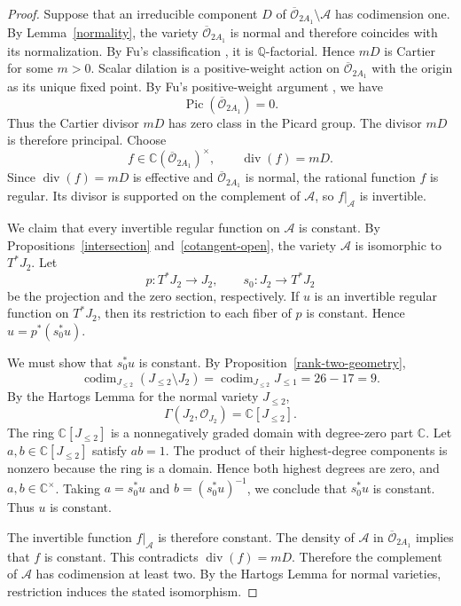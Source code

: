 \documentclass[12pt]{article}
\theoremstyle{definition}
\DeclareMathOperator{\codim}{codim}
\begin{document}
\begin{proof}
Suppose that an irreducible component \(D\) of
\(\overline{\mathcal O}_{2A_1}\setminus\mathcal A\) has codimension one.
By Lemma~\ref{normality}, the variety \(\overline{\mathcal O}_{2A_1}\) is
normal and therefore coincides with its normalization. By Fu's
classification \cite[Proposition~4.4]{FuQFactorial}, it is
\(\mathbb Q\)-factorial. Hence \(mD\) is Cartier for some
\(m>0\). Scalar dilation is a positive-weight action on
\(\overline{\mathcal O}_{2A_1}\) with the origin as its unique fixed point. By
Fu's positive-weight argument
\cite[Proof of Lemma~4.3]{FuQFactorial}, we have
\[
    \operatorname{Pic}(\overline{\mathcal O}_{2A_1})=0.
\]
Thus the Cartier divisor \(mD\) has zero class in the Picard group. The
divisor \(mD\) is therefore principal. Choose
\[
    f\in\mathbb C(\overline{\mathcal O}_{2A_1})^\times,
    \qquad
    \operatorname{div}(f)=mD.
\]
Since \(\operatorname{div}(f)=mD\) is effective and
\(\overline{\mathcal O}_{2A_1}\) is normal, the rational function \(f\) is
regular. Its divisor is supported on the complement of \(\mathcal A\),
so \(f|_{\mathcal A}\) is invertible.

We claim that every invertible regular function on \(\mathcal A\) is
constant. By Propositions~\ref{intersection} and~\ref{cotangent-open},
the variety \(\mathcal A\) is isomorphic to \(T^*J_2\). Let
\[
    p:T^*J_2\longrightarrow J_2,
    \qquad
    s_0:J_2\longrightarrow T^*J_2
\]
be the projection and the zero section, respectively. If \(u\) is an
invertible regular function on \(T^*J_2\),
then its restriction to each fiber of \(p\) is constant. Hence
\(u=p^*(s_0^*u)\).

We must show that \(s_0^*u\) is constant. By
Proposition~\ref{rank-two-geometry},
\[
    \codim_{J_{\leq2}}(J_{\leq2}\setminus J_2)
    =\codim_{J_{\leq2}}J_{\leq1}=26-17=9.
\]
By the Hartogs Lemma for the normal variety \(J_{\leq2}\),
\[
    \Gamma(J_2,\mathcal O_{J_2})=\mathbb C[J_{\leq2}].
\]
The ring \(\mathbb C[J_{\leq2}]\) is a nonnegatively graded domain with
degree-zero part \(\mathbb C\). Let \(a,b\in\mathbb C[J_{\leq2}]\) satisfy \(ab=1\).
The product of their highest-degree components is nonzero because the
ring is a domain. Hence both highest degrees are zero, and
\(a,b\in\mathbb C^\times\). Taking \(a=s_0^*u\) and \(b=(s_0^*u)^{-1}\), we
conclude that \(s_0^*u\) is constant. Thus \(u\) is constant.

The invertible function \(f|_{\mathcal A}\) is therefore constant. The
density of \(\mathcal A\) in \(\overline{\mathcal O}_{2A_1}\) implies that \(f\)
is constant. This contradicts \(\operatorname{div}(f)=mD\). Therefore the
complement of \(\mathcal A\) has codimension at least two.
By the Hartogs Lemma for normal varieties, restriction induces the
stated isomorphism.
\end{proof}
\end{document}
